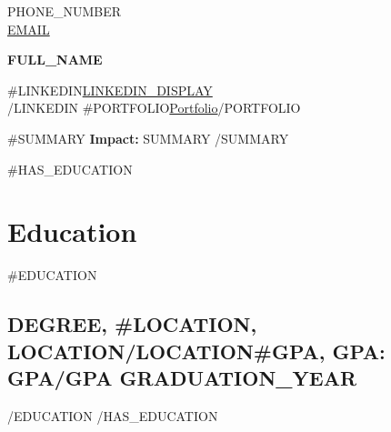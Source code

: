 \documentclass[10pt, a4paper]{article}
\newcommand{\hskills}[1]{{\bfseries #1} }
\begin{document}

\begin{center}
    \begin{minipage}[b]{0.3\textwidth}
            \large {{PHONE_NUMBER}} \\
            \large \href{mailto:{{EMAIL}}}{{EMAIL}} 
    \end{minipage}%
    \begin{minipage}[b]{0.4\textwidth}
            \centering
            {\Huge \textbf{{{FULL_NAME}}}}
    \end{minipage}%
    \begin{minipage}[b]{0.3\textwidth}
            \flushright \large
            {{#LINKEDIN}}\href{{{LINKEDIN}}}{{{LINKEDIN_DISPLAY}}} \\ {{/LINKEDIN}}
            {{#PORTFOLIO}}\href{{{PORTFOLIO}}}{Portfolio}{{/PORTFOLIO}}
    \end{minipage}   
    
\vspace{-0.15cm} 
{\color{UI_blue} \hrulefill}
\end{center}
\vspace{-0.25cm}

{{#SUMMARY}}
\hskills{Impact:} {{SUMMARY}}
\vspace{-0.2cm}
{{/SUMMARY}}

{{#HAS_EDUCATION}}
\section{Education}
{{#EDUCATION}}

\subsection*{{{DEGREE}}, {\normalsize {}}{{#LOCATION}}, {{LOCATION}}{{/LOCATION}}{{#GPA}}, GPA: {{GPA}}{{/GPA}} \hfill {{GRADUATION_YEAR}}}
\vspace{0.1cm}
{{/EDUCATION}}
{{/HAS_EDUCATION}}
\end{document}
